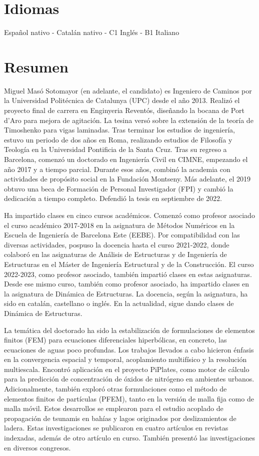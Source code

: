 \documentclass[12pt]{article}
\begin{document}
\section{Idiomas}
Español nativo - Catalán nativo - C1 Inglés - B1 Italiano


\section{Resumen}
Miguel Masó Sotomayor (en adelante, el candidato) es Ingeniero de Caminos por la Universidad Politécnica de Catalunya (UPC) desde el año 2013. Realizó el proyecto final de carrera en Enginyeria Reventós, diseñando la bocana de Port d'Aro para mejora de agitación. La tesina versó sobre la extensión de la teoría de Timoshenko para vigas laminadas. Tras terminar los estudios de ingeniería, estuvo un periodo de dos años en Roma, realizando estudios de Filosofía y Teología en la Universidad Pontificia de la Santa Cruz. Tras su regreso a Barcelona, comenzó un doctorado en Ingeniería Civil en CIMNE, empezando el año 2017 y a tiempo parcial. Durante esos años, combinó la academia con actividades de propósito social en la Fundación Montseny. Más adelante, el 2019 obtuvo una beca de Formación de Personal Investigador (FPI) y cambió la dedicación a tiempo completo. Defendió la tesis en septiembre de 2022.

Ha impartido clases en cinco cursos académicos. Comenzó como profesor asociado el curso académico 2017-2018 en la asignatura de Métodos Numéricos en la Escuela de Ingeniería de Barcelona Este (EEBE). Por compatibilidad con las diversas actividades, pospuso la docencia hasta el curso 2021-2022, donde colaboró en las asignaturas de Análisis de Estructuras y de Ingeniería de Estructuras en el Máster de Ingeniería Estructural y de la Construcción. El curso 2022-2023, como profesor asociado, también impartió clases en estas asignaturas. Desde ese mismo curso, también como profesor asociado, ha impartido clases en la asignatura de Dinámica de Estructuras. La docencia, según la asignatura, ha sido en catalán, castellano o inglés. En la actualidad, sigue dando clases de Dinámica de Estructuras.

La temática del doctorado ha sido la estabilización de formulaciones de elementos finitos (FEM) para ecuaciones diferenciales hiperbólicas, en concreto, las ecuaciones de aguas poco profundas. Los trabajos llevados a cabo hicieron énfasis en la convergencia espacial y temporal, acoplamiento multifísico y la resolución multiescala. Encontró aplicación en el proyecto PiPlates, como motor de cálculo para la predicción de concentración de óxidos de nitrógeno en ambientes urbanos. Adicionalmente, también exploró otras formulaciones como el método de elementos finitos de partículas (PFEM), tanto en la versión de malla fija como de malla móvil. Estos desarrollos se emplearon para el estudio acoplado de propagación de tsunamis en bahías y lagos originados por deslizamientos de ladera. Estas investigaciones se publicaron en cuatro artículos en revistas indexadas, además de otro artículo en curso. También presentó las investigaciones en diversos congresos.
\end{document}
